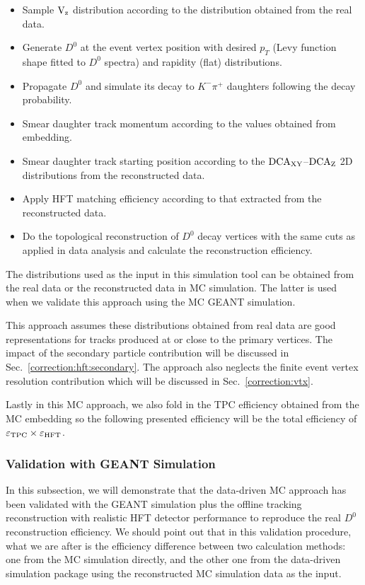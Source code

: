 \documentclass[%
 reprint,	
 amsmath,amssymb,
 aps,
 prc,
]{revtex4-1}
\begin{document}
\begin{itemize}
\item Sample $\textup{V}_\textup{z}$ distribution according to the distribution obtained from the real data.
\item Generate $D^0$ at the event vertex position with desired $p_T$ (Levy function shape fitted to $D^0$ spectra) and rapidity (flat) distributions.
\item Propagate $D^0$ and simulate its decay to $K^-\pi^+$ daughters following the decay probability.
\item Smear daughter track momentum according to the values obtained from embedding.
\item Smear daughter track starting position according to the $\textup{DCA}_{\textup{XY}}$--$\textup{DCA}_\textup{Z}$ 2D distributions from the reconstructed data.
\item Apply HFT matching efficiency according to that extracted from the reconstructed data.
\item Do the topological reconstruction of $D^0$ decay vertices with the same cuts as applied in data analysis and calculate the reconstruction efficiency.
\end{itemize}
The distributions used as the input in this simulation tool can be obtained from the real data or the reconstructed data in MC simulation. The latter is used when we validate this approach using the MC GEANT simulation. 

This approach assumes these distributions obtained from real data are good representations for tracks produced at or close to the primary vertices. The impact of the secondary particle contribution will be discussed in Sec.~\ref{correction:hft:secondary}. The approach also neglects the finite event vertex resolution contribution which will be discussed in Sec.~\ref{correction:vtx}.

Lastly in this MC approach, we also fold in the TPC efficiency obtained from the MC embedding so the following presented efficiency will be the total efficiency of $\varepsilon_{\rm TPC}\times\varepsilon_{\rm HFT}$.

\subsubsection{Validation with GEANT Simulation}
\label{correction:hft:validation}

In this subsection, we will demonstrate that the data-driven MC approach has been validated with the GEANT simulation plus the offline tracking reconstruction with realistic HFT detector performance to reproduce the real $D^0$ reconstruction efficiency. We should point out that in this validation procedure, what we are after is the efficiency difference between two calculation methods: one from the MC simulation directly, and the other one from the data-driven simulation package using the reconstructed MC simulation data as the input.
\end{document}
